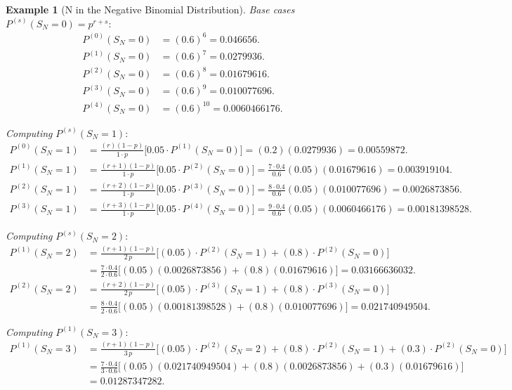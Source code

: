 \documentclass[11pt]{amsart}
\theoremstyle{definition}
\newtheorem{example}{Example}
\theoremstyle{plain}
\begin{document}
\begin{example}[N in the Negative Binomial Distribution]
\medskip
\noindent\textit{Base cases} $P^{(s)}(S_N = 0) = p^{r+s}$:
\begin{align*}
P^{(0)}(S_N = 0) &= (0.6)^{6} = 0.046656. \\
P^{(1)}(S_N = 0) &= (0.6)^{7} = 0.0279936. \\
P^{(2)}(S_N = 0) &= (0.6)^{8} = 0.01679616. \\
P^{(3)}(S_N = 0) &= (0.6)^{9} = 0.010077696. \\
P^{(4)}(S_N = 0) &= (0.6)^{10} = 0.0060466176.
\end{align*}

\medskip
\noindent\textit{Computing} $P^{(s)}(S_N = 1)$:
\begin{align*}
P^{(0)}(S_N = 1)
    &= \frac{(r)(1-p)}{1 \cdot p}\bigl[0.05 \cdot P^{(1)}(S_N = 0)\bigr]
     = (0.2)(0.0279936)
     = 0.00559872. \\
P^{(1)}(S_N = 1)
    &= \frac{(r+1)(1-p)}{1 \cdot p}\bigl[0.05 \cdot P^{(2)}(S_N = 0)\bigr]
     = \tfrac{7 \cdot 0.4}{0.6}(0.05)(0.01679616)
     = 0.003919104. \\
P^{(2)}(S_N = 1)
    &= \frac{(r+2)(1-p)}{1 \cdot p}\bigl[0.05 \cdot P^{(3)}(S_N = 0)\bigr]
     = \tfrac{8 \cdot 0.4}{0.6}(0.05)(0.010077696)
     = 0.0026873856. \\
P^{(3)}(S_N = 1)
    &= \frac{(r+3)(1-p)}{1 \cdot p}\bigl[0.05 \cdot P^{(4)}(S_N = 0)\bigr]
     = \tfrac{9 \cdot 0.4}{0.6}(0.05)(0.0060466176)
     = 0.00181398528.
\end{align*}

\medskip
\noindent\textit{Computing} $P^{(s)}(S_N = 2)$:
\begin{align*}
P^{(1)}(S_N = 2)
    &= \frac{(r+1)(1-p)}{2\,p}
       \bigl[(0.05)\cdot P^{(2)}(S_N = 1) + (0.8)\cdot P^{(2)}(S_N = 0)\bigr] \\
    &= \frac{7 \cdot 0.4}{2 \cdot 0.6}
       \bigl[(0.05)(0.0026873856) + (0.8)(0.01679616)\bigr]
     = 0.03166636032. \\
P^{(2)}(S_N = 2)
    &= \frac{(r+2)(1-p)}{2\,p}
       \bigl[(0.05)\cdot P^{(3)}(S_N = 1) + (0.8)\cdot P^{(3)}(S_N = 0)\bigr] \\
    &= \frac{8 \cdot 0.4}{2 \cdot 0.6}
       \bigl[(0.05)(0.00181398528) + (0.8)(0.010077696)\bigr]
     = 0.021740949504.
\end{align*}

\medskip
\noindent\textit{Computing} $P^{(1)}(S_N = 3)$:
\begin{align*}
P^{(1)}(S_N = 3)
    &= \frac{(r+1)(1-p)}{3\,p}
       \bigl[(0.05)\cdot P^{(2)}(S_N = 2) + (0.8)\cdot P^{(2)}(S_N = 1)
       + (0.3)\cdot P^{(2)}(S_N = 0)\bigr] \\
    &= \frac{7 \cdot 0.4}{3 \cdot 0.6}
       \bigl[(0.05)(0.021740949504) + (0.8)(0.0026873856)
       + (0.3)(0.01679616)\bigr] \\
    &= 0.01287347282.
\end{align*}


\end{example}
\end{document}
